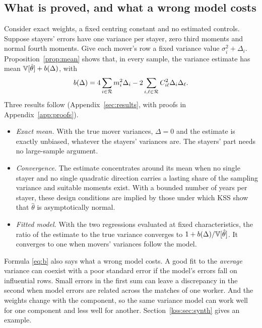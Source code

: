 \subsection{What is proved, and what a wrong model costs}
Consider exact weights, a fixed centring constant and no estimated controls.
Suppose stayers' errors have one variance per stayer, zero third moments and
normal fourth moments. Give each mover's row a fixed variance value
$\sigma_i^2+\Delta_i$. Proposition~\ref{prop:mean} shows that, in every sample, the
variance estimate has mean $\mathbb{V}[\hat\theta]+b(\Delta)$, with
\begin{equation}\label{eq:b}
 b(\Delta)=4\sum_{i\in\mathcal{R}}m_i^2\Delta_i
      -2\sum_{i,\ell\in\mathcal{R}}C_{i\ell}^2\Delta_i\Delta_\ell .
\end{equation}
Three results follow (Appendix~\ref{sec:results}, with proofs in
Appendix~\ref{app:proofs}).
\begin{itemize}
\item \emph{Exact mean.} With the true mover variances, $\Delta=0$ and the estimate is
exactly unbiased, whatever the stayers' variances are. The stayers' part needs no
large-sample argument.
\item \emph{Convergence.} The estimate concentrates around its mean when no single
stayer and no single quadratic direction carries a lasting share of the sampling
variance and suitable moments exist. With a bounded number of years per stayer, these design conditions are
implied by those under which KSS show that $\hat\theta$ is asymptotically normal.
\item \emph{Fitted model.} With the two regressions evaluated at fixed
characteristics, the ratio of the estimate to the true variance converges to
$1+b(\Delta)/\mathbb{V}[\hat\theta]$. It converges to one when movers' variances follow the
model.
\end{itemize}

Formula \eqref{eq:b} also says what a wrong model costs. A good fit to the
\emph{average} variance can coexist with a poor standard error if the model's errors
fall on influential rows. Small errors in the first sum can leave a discrepancy in
the second when model errors are related across the matches of one worker. And the
weights change with the component, so the same variance model can work well for one
component and less well for another. Section~\ref{kss:sec:synth} gives an example.

